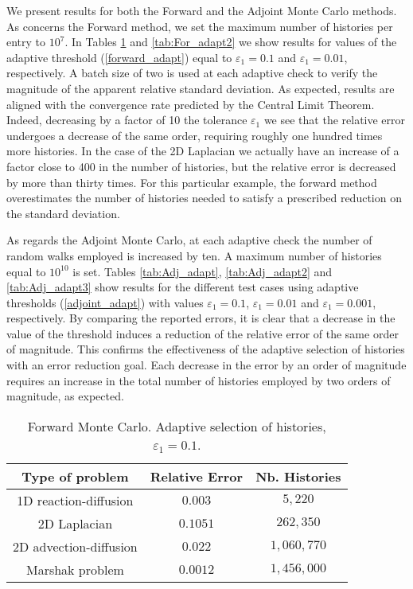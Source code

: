 \documentclass[final,leqno,onefignum,onetabnum]{siamltex1213}
\begin{document}
We present results for both the Forward
and the Adjoint Monte Carlo methods.
As concerns the Forward method, we set the maximum number of
histories per entry to $10^7$. In Tables \ref{tab:For_adapt} and \ref{tab:For_adapt2}
we show results for values of the adaptive threshold
(\ref{forward_adapt}) equal to
$\varepsilon_1=0.1$ and $\varepsilon_1=0.01$, respectively.
A batch size of two is used at each
adaptive check to verify the magnitude of the apparent relative standard
deviation. As expected, results are aligned with the convergence rate predicted
by the Central Limit Theorem. Indeed, decreasing by a factor of 10 the
tolerance $\varepsilon_1$ we see that the relative error undergoes a
decrease of the same order, requiring roughly
one hundred times more histories. In the case of the 2D Laplacian we actually
have an increase of a factor close to 400 in the number of histories, but the
relative error is decreased by more than thirty times. For this particular
example, the forward method overestimates the number of histories
needed to satisfy a prescribed reduction on the standard deviation.

As regards the Adjoint Monte Carlo, at each adaptive check the number of
random walks employed is increased by ten.
A maximum number of histories equal to $10^{10}$ is set.
Tables \ref{tab:Adj_adapt}, \ref{tab:Adj_adapt2} and
\ref{tab:Adj_adapt3} show results
for the different test cases using adaptive thresholds (\ref{adjoint_adapt})
with values $\varepsilon_1=0.1$, $\varepsilon_1=0.01$ and
$\varepsilon_1=0.001$, respectively.
By comparing the reported errors, it is
clear that a decrease in the value of the threshold
induces a reduction of the relative error of the same order of magnitude.
This confirms
the effectiveness of the adaptive selection of histories with an error
reduction goal. Each decrease in the error by an order of magnitude
requires an increase in the total number of histories employed by
two orders of magnitude, as expected.

\begin{table}[!t]
\centering
\begin{tabular}{|c|c|c|}
\hline
\textbf{Type of problem} & \textbf{Relative Error} &\textbf{Nb. Histories}\\
\hline
1D reaction-diffusion & $0.003$ & $5,220$\\
\hline
2D Laplacian & $0.1051$ & $262,350$\\
\hline
2D advection-diffusion & $0.022$  & $1,060,770$\\
\hline
Marshak problem & $0.0012$ & $1,456,000$\\
\hline
\end{tabular}
\caption{Forward Monte Carlo. Adaptive selection of histories,
$\varepsilon_1=0.1$.}
\label{tab:For_adapt}
\end{table}
\end{document}
